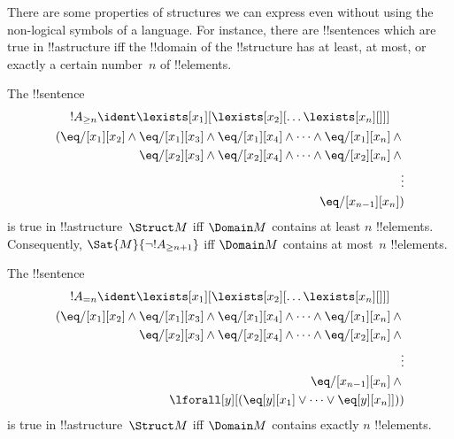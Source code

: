 \documentclass[../../../include/open-logic-section]{subfiles}
\begin{document}


\begin{explain}
There are some properties of structures we can express even without
using the non-logical symbols of a language.  For instance, there are
!!{sentence}s which are true in !!a{structure} iff the !!{domain} of
the !!{structure} has at least, at most, or exactly a certain
number~$n$ of !!{element}s.
\end{explain}

\begin{prop}
The !!{sentence}
\begin{multline*}
  !A_{\ge n} \ident \lexists[x_1][\lexists[x_2][\dots\lexists[x_n][{}]]]\\
  \begin{aligned}
  (\eq/[x_1][x_2] \land {}
  \eq/[x_1][x_3] \land \eq/[x_1][x_4] \land \dots \land \eq/[x_1][x_n] \land {}\\
\eq/[x_2][x_3] \land \eq/[x_2][x_4] \land \dots \land {} \eq/[x_2][x_n] \land {} \\
\vdots\\
\eq/[x_{n-1}][x_n])
\end{aligned}
\end{multline*}
is true in !!a{structure}~$\Struct M$ iff $\Domain M$ contains at
least $n$ !!{element}s. Consequently, $\Sat{M}{\lnot !A_{\ge n+1}}$ iff
$\Domain M$ contains at most~$n$ !!{element}s.

\end{prop}

\begin{prop}
The !!{sentence}
\begin{multline*}
!A_{= n} \ident \lexists[x_1][\lexists[x_2][\dots\lexists[x_n][{}]]] \\
\begin{aligned}
  (\eq/[x_1][x_2] \land {}
  \eq/[x_1][x_3] \land \eq/[x_1][x_4] \land \dots \land \eq/[x_1][x_n] \land {}\\
\eq/[x_2][x_3] \land \eq/[x_2][x_4] \land \dots \land {} \eq/[x_2][x_n] \land {} \\
\vdots\\
\eq/[x_{n-1}][x_n] \land {} \\
\lforall[y][(\eq[y][x_1] \lor \dots \lor \eq[y][x_n]]))
\end{aligned}
\end{multline*}
is true in !!a{structure}~$\Struct M$ iff $\Domain M$ contains
exactly $n$ !!{element}s.
\end{prop}
\end{document}
